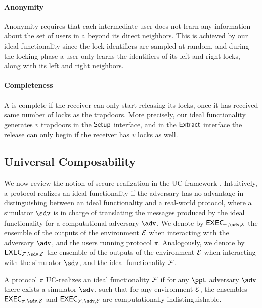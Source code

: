 \paragraph{Anonymity} Anonymity requires that each intermediate user does not learn any information 
about the set of users in a \sysname beyond its direct neighbors.
This is achieved by our ideal functionality since the lock identifiers are sampled at random, and 
during the locking phase a user only learns the identifiers of its left and right locks, along with 
its left and right neighbors.

\paragraph{Completeness} A \sysname is complete if the receiver can only start releasing its locks,
once it has received same number of locks as the trapdoors. More precisely, our ideal functionality 
generates $v$ trapdoors in the $\mathsf{Setup}$ interface, and in the $\mathsf{Extract}$ interface the release can 
only begin if the receiver has $v$ locks as well.

\subsection{Universal Composability}
\label{sec:uc}

We now review the notion of secure realization in the UC framework \cite{canetti}. 
Intuitively, a protocol realizes an ideal functionality if the adversary has no 
advantage in distinguishing between an ideal functionality and a real-world protocol, 
where a simulator $\sdv$ is in charge of translating the messages produced by the 
ideal functionality for a computational adversary $\adv$. We denote by $\exec_{\pi, 
\adv, \dist}$ the ensemble of the outputs of the environment $\mathcal{E}$ when interacting 
with the adversary $\adv$, and the users running protocol $\pi$. Analogously, we denote  
by $\exec_{\FF, \sdv, \dist}$ the ensemble of the outputs of the environment $\mathcal{E}$ 
when interacting with the simulator $\sdv$, and the ideal functionality $\mathcal{F}$.

\begin{definition}
A protocol $\pi$ UC-realizes an ideal functionality $\mathcal{F}$ if for any $\ppt$ adversary 
$\adv$ there exists a simulator $\sdv$, such that for any environment $\mathcal{E}$, the 
ensembles $\exec_{\pi, \adv, \dist}$ and $\exec_{\FF, \sdv, \dist}$ are computationally 
indistinguishable.
\end{definition}

